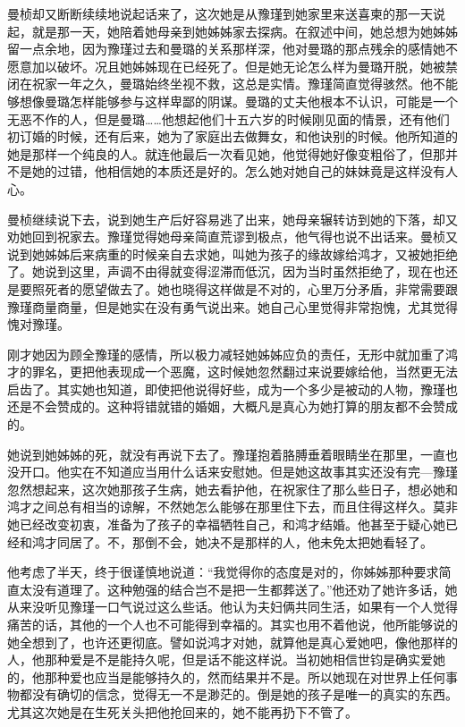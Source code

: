 \par 曼桢却又断断续续地说起话来了，这次她是从豫瑾到她家里来送喜柬的那一天说起，就是那一天，她陪着她母亲到她姊姊家去探病。在叙述中间，她总想为她姊姊留一点余地，因为豫瑾过去和曼璐的关系那样深，他对曼璐的那点残余的感情她不愿意加以破坏。况且她姊姊现在已经死了。但是她无论怎么样为曼璐开脱，她被禁闭在祝家一年之久，曼璐始终坐视不救，这总是实情。豫瑾简直觉得骇然。他不能够想像曼璐怎样能够参与这样卑鄙的阴谋。曼璐的丈夫他根本不认识，可能是一个无恶不作的人，但是曼璐……他想起他们十五六岁的时候刚见面的情景，还有他们初订婚的时候，还有后来，她为了家庭出去做舞女，和他诀别的时候。他所知道的她是那样一个纯良的人。就连他最后一次看见她，他觉得她好像变粗俗了，但那并不是她的过错，他相信她的本质还是好的。怎么她对她自己的妹妹竟是这样没有人心。
\par 曼桢继续说下去，说到她生产后好容易逃了出来，她母亲辗转访到她的下落，却又劝她回到祝家去。豫瑾觉得她母亲简直荒谬到极点，他气得也说不出话来。曼桢又说到她姊姊后来病重的时候亲自去求她，叫她为孩子的缘故嫁给鸿才，又被她拒绝了。她说到这里，声调不由得就变得涩滞而低沉，因为当时虽然拒绝了，现在也还是要照死者的愿望做去了。她也晓得这样做是不对的，心里万分矛盾，非常需要跟豫瑾商量商量，但是她实在没有勇气说出来。她自己心里觉得非常抱愧，尤其觉得愧对豫瑾。
\par 刚才她因为顾全豫瑾的感情，所以极力减轻她姊姊应负的责任，无形中就加重了鸿才的罪名，更把他表现成一个恶魔，这时候她忽然翻过来说要嫁给他，当然更无法启齿了。其实她也知道，即使把他说得好些，成为一个多少是被动的人物，豫瑾也还是不会赞成的。这种将错就错的婚姻，大概凡是真心为她打算的朋友都不会赞成的。
\par 她说到她姊姊的死，就没有再说下去了。豫瑾抱着胳膊垂着眼睛坐在那里，一直也没开口。他实在不知道应当用什么话来安慰她。但是她这故事其实还没有完—豫瑾忽然想起来，这次她那孩子生病，她去看护他，在祝家住了那么些日子，想必她和鸿才之间总有相当的谅解，不然她怎么能够在那里住下去，而且住得这样久。莫非她已经改变初衷，准备为了孩子的幸福牺牲自己，和鸿才结婚。他甚至于疑心她已经和鸿才同居了。不，那倒不会，她决不是那样的人，他未免太把她看轻了。
\par 他考虑了半天，终于很谨慎地说道：“我觉得你的态度是对的，你姊姊那种要求简直太没有道理了。这种勉强的结合岂不是把一生都葬送了。”他还劝了她许多话，她从来没听见豫瑾一口气说过这么些话。他认为夫妇俩共同生活，如果有一个人觉得痛苦的话，其他的一个人也不可能得到幸福的。其实也用不着他说，他所能够说的她全想到了，也许还更彻底。譬如说鸿才对她，就算他是真心爱她吧，像他那样的人，他那种爱是不是能持久呢，但是话不能这样说。当初她相信世钧是确实爱她的，他那种爱也应当是能够持久的，然而结果并不是。所以她现在对世界上任何事物都没有确切的信念，觉得无一不是渺茫的。倒是她的孩子是唯一的真实的东西。尤其这次她是在生死关头把他抢回来的，她不能再扔下不管了。
